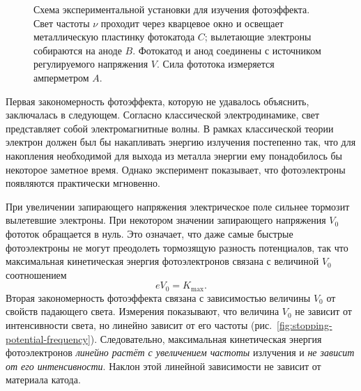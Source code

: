 \documentclass[a4paper, 12pt]{article}
\begin{document}
\begin{figure}[h!]
  \caption{Схема экспериментальной установки для изучения фотоэффекта.
  Свет частоты $\nu$ проходит через кварцевое окно и освещает металлическую
  пластинку фотокатода $C$; вылетающие электроны
  собираются на аноде $B$. Фотокатод и анод соединены с источником регулируемого
  напряжения $V$. Сила фототока измеряется амперметром $A$.}
  \label{fig:photoelectric-apparatus}
\end{figure}

Первая закономерность фотоэффекта, которую не удавалось объяснить, заключалась в
следующем. Согласно классической электродинамике, свет представляет собой
электромагнитные волны. В рамках классической теории электрон должен был бы
накапливать энергию излучения постепенно так, что для накопления
необходимой для выхода из металла энергии ему понадобилось бы некоторое
заметное время. Однако эксперимент показывает, что фотоэлектроны появляются
практически мгновенно.

При увеличении запирающего напряжения электрическое поле сильнее тормозит
вылетевшие электроны. При некотором значении запирающего напряжения $V_0$
фототок обращается в нуль. Это означает, что даже самые быстрые фотоэлектроны
не могут преодолеть тормозящую разность потенциалов, так что максимальная
кинетическая энергия фотоэлектронов связана с величиной $V_0$ соотношением
\begin{equation}
  e V_0 = K_{\text{max}}.
\end{equation}
Вторая закономерность фотоэффекта связана с зависимостью величины $V_0$ от
свойств падающего света. Измерения показывают, что величина $V_0$ не зависит
от интенсивности света, но линейно зависит от его частоты
(рис.~\ref{fig:stopping-potential-frequency}). Следовательно, максимальная
кинетическая энергия фотоэлектронов \emph{линейно растёт с увеличением
частоты} излучения и \emph{не зависит от его интенсивности}. Наклон этой
линейной зависимости не зависит от материала катода.
\end{document}
